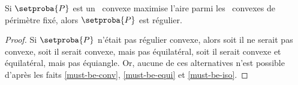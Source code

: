 

\begin{fact} \label{must-be-reg}
    Si $\setproba{P}$ est un \ngone\ convexe maximise l'aire parmi les \ngones\ convexes de périmètre fixé, alors $\setproba{P}$ est régulier.
\end{fact}


\begin{proof}
    Si $\setproba{P}$ n'était pas régulier convexe, alors 
    soit il ne serait pas convexe, 
    soit il serait convexe, mais pas équilatéral, 
    soit il serait convexe et équilatéral, mais pas équiangle.
    Or, aucune de ces alternatives n'est possible d'après les faits \ref{must-be-conv}, \ref{must-be-equi} et \ref{must-be-iso}.
\end{proof}


%
%
%
%	
%
